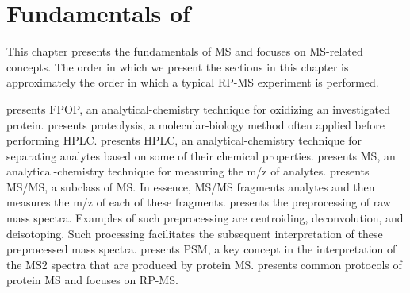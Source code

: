 
\glsunsetall
\chapter{Fundamentals of \texorpdfstring{}{mass spectrometry}}
\label{chap:fund2}
\glsresetall

This chapter presents the fundamentals of \gls{MS} and focuses on \gls{MS}-related concepts.
The order in which we present the sections in this chapter is approximately the order in which a typical \gls{RP-MS} experiment is performed.

 presents \gls{FPOP}, an analytical-chemistry technique for oxidizing an investigated protein.
 presents proteolysis, a molecular-biology method often applied before performing \gls{HPLC}.
 presents \gls{HPLC}, an analytical-chemistry technique for separating analytes based on some of their chemical properties.
 presents \gls{MS}, an analytical-chemistry technique for measuring the \gls{m/z} of analytes.
 presents \gls{MS/MS}, a subclass of \gls{MS}.
In essence, \gls{MS/MS} fragments analytes and then measures the \gls{m/z} of each of these fragments.
 presents the preprocessing of raw mass spectra.
Examples of such preprocessing are centroiding, deconvolution, and deisotoping.
Such processing facilitates the subsequent interpretation of these preprocessed mass spectra.
 presents \gls{PSM}, a key concept in the interpretation of the \gls{MS2} spectra that are produced by protein \gls{MS}.
 presents common protocols of protein \gls{MS} and focuses on \gls{RP-MS}.

\section{\texorpdfstring{}{FPOP}} 
\label{sec:MS:FPOP}

